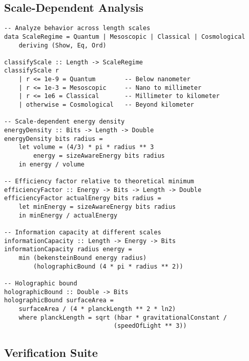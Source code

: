 \documentclass[11pt,a4paper]{article}
\theoremstyle{definition}
\begin{document}
\subsection{Scale-Dependent Analysis}

\begin{lstlisting}
-- Analyze behavior across length scales
data ScaleRegime = Quantum | Mesoscopic | Classical | Cosmological
    deriving (Show, Eq, Ord)

classifyScale :: Length -> ScaleRegime
classifyScale r
    | r <= 1e-9 = Quantum        -- Below nanometer
    | r <= 1e-3 = Mesoscopic     -- Nano to millimeter
    | r <= 1e6 = Classical       -- Millimeter to kilometer
    | otherwise = Cosmological   -- Beyond kilometer

-- Scale-dependent energy density
energyDensity :: Bits -> Length -> Double
energyDensity bits radius =
    let volume = (4/3) * pi * radius ** 3
        energy = sizeAwareEnergy bits radius
    in energy / volume

-- Efficiency factor relative to theoretical minimum
efficiencyFactor :: Energy -> Bits -> Length -> Double
efficiencyFactor actualEnergy bits radius =
    let minEnergy = sizeAwareEnergy bits radius
    in minEnergy / actualEnergy

-- Information capacity at different scales
informationCapacity :: Length -> Energy -> Bits
informationCapacity radius energy =
    min (bekensteinBound energy radius)
        (holographicBound (4 * pi * radius ** 2))

-- Holographic bound
holographicBound :: Double -> Bits
holographicBound surfaceArea =
    surfaceArea / (4 * planckLength ** 2 * ln2)
    where planckLength = sqrt (hbar * gravitationalConstant / 
                              (speedOfLight ** 3))
\end{lstlisting}

\subsection{Verification Suite}
\end{document}
